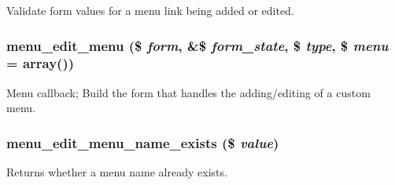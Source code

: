 \label{menu_8admin_8inc_a9b3b72516acaba98b8be3965616cc735}
Validate form values for a menu link being added or edited. \hypertarget{menu_8admin_8inc_a7b2df6cf690f6d62f9521358229786b3}{
\subsubsection[{menu\_\-edit\_\-menu}]{\setlength{\rightskip}{0pt plus 5cm}menu\_\-edit\_\-menu (\$ {\em form}, \/  \&\$ {\em form\_\-state}, \/  \$ {\em type}, \/  \$ {\em menu} = {\ttfamily array()})}}
\label{menu_8admin_8inc_a7b2df6cf690f6d62f9521358229786b3}
Menu callback; Build the form that handles the adding/editing of a custom menu. \hypertarget{menu_8admin_8inc_aa3f0e1738307797efc1d7b8502064020}{
\subsubsection[{menu\_\-edit\_\-menu\_\-name\_\-exists}]{\setlength{\rightskip}{0pt plus 5cm}menu\_\-edit\_\-menu\_\-name\_\-exists (\$ {\em value})}}
\label{menu_8admin_8inc_aa3f0e1738307797efc1d7b8502064020}
Returns whether a menu name already exists.

